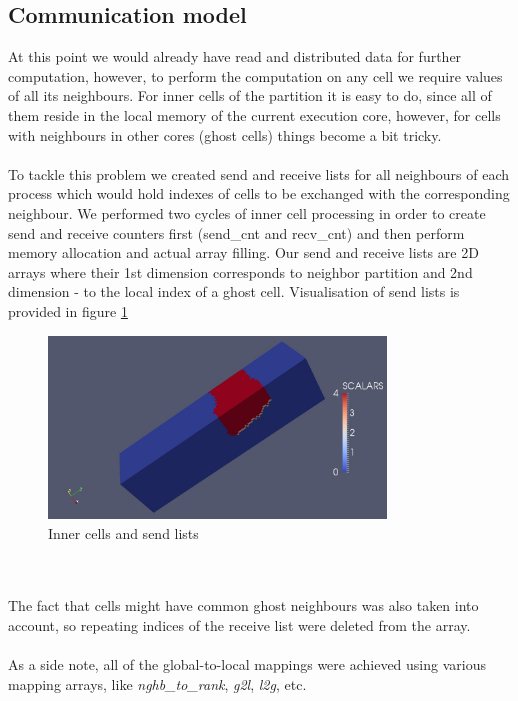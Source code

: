 \documentclass{article}
\begin{document}
\subsection{Communication model}
At this point we would already have read and distributed data for further computation, however, to perform the computation on any cell we require values of all its neighbours. For inner cells of the partition it is easy to do, since all of them reside in the local memory of the current execution core, however, for cells with neighbours in other cores (ghost cells) things become a bit tricky.
\\\\
To tackle this problem we created send and receive lists for all neighbours of each process which would hold indexes of cells to be exchanged with the corresponding neighbour. We performed two cycles of inner cell processing in order to create send and receive counters first (send\_cnt and recv\_cnt) and then perform memory allocation and actual array filling. Our send and receive lists are 2D arrays where their 1st dimension corresponds to neighbor partition and 2nd dimension - to the local index of a ghost cell. Visualisation of send lists is provided in figure \ref{fig:6}
\begin{figure}[h!]
	\begin{center}
		\includegraphics[width=0.8\textwidth]{send-listst.jpg}
		\caption{Inner cells and send lists}
		\label{fig:6}
	\end{center}
\end{figure}
\\\\
The fact that cells might have common ghost neighbours was also taken into account, so repeating indices of the receive list were deleted from the array.
\\\\
As a side note, all of the global-to-local mappings were achieved using various mapping arrays, like \textit{nghb\_to\_rank}, \textit{g2l}, \textit{l2g}, etc.
\end{document}
